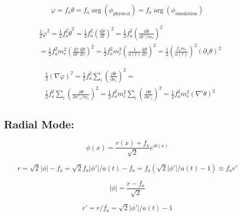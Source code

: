 \documentclass[a4paper]{article}
\begin{document}
\begin{equation}
    \varphi = f_a \theta = f_a \arg(\phi_\mathrm{physical}) = f_a \arg(\phi_\mathrm{simulation})
\end{equation}

\begin{align}
    &\frac{1}{2} \dot{\varphi}^2 = \frac{1}{2} f_a^2 \dot{\theta}^2
    = \frac{1}{2} f_a^2 \left( \frac{\mathrm{d} \theta}{\mathrm{d} t} \right)^2
    = \frac{1}{2} f_a^2 \left( \frac{\mathrm{d} \theta}{\mathrm{d} t' / m_r} \right)^2 \\
    &= \frac{1}{2} f_a^2 m_r^2 \left( \frac{\mathrm{d} \tau}{\mathrm{d} t'} \frac{\mathrm{d} \theta}{\mathrm{d} \tau} \right)^2
    = \frac{1}{2} f_a^2 m_r^2 \left( \frac{1}{a(t)} \frac{\mathrm{d} \theta}{\mathrm{d} \tau} \right)^2
    = \frac{1}{2} \left( \frac{f_a m_r}{a(t)} \right)^2 \left( \partial_\tau \theta \right)^2
\end{align}

\begin{align}
 &\frac{1}{2} (\nabla \varphi)^2 =
 \frac{1}{2} f_a^2 \sum_i \left(\frac{\partial \theta}{\partial x_i}\right)^2 = \\
 &\frac{1}{2} f_a^2 \sum_i \left(\frac{\partial \theta}{\partial x'_i / m_r}\right)^2 =
 \frac{1}{2} f_a^2 m_r^2 \sum_i \left(\frac{\partial \theta}{\partial x'_i}\right)^2 =
 \frac{1}{2} f_a^2 m_r^2 (\nabla' \theta)^2
\end{align}

\subsection{Radial Mode:}

\begin{equation}
    \phi(x) = \frac{r(x) + f_a}{\sqrt{2}} e^{i \theta(x) }
\end{equation}

\begin{equation}
    r = \sqrt{2} |\phi| - f_a
    = \sqrt{2} f_a |\phi'| / a(t) - f_a
    = f_a \left( \sqrt{2} |\phi'| / a(t) - 1 \right)
    \equiv f_a r'
\end{equation}

\begin{equation}
    |\phi| = \frac{r - f_a}{\sqrt{2}}
\end{equation}

\begin{equation}
    r' = r / f_a = \sqrt{2} |\phi'| / a(t) - 1
\end{equation}
\end{document}
